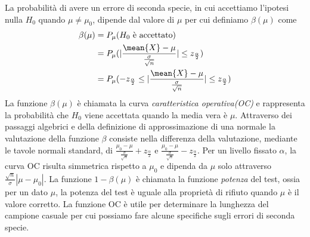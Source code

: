 La probabilità di avere un errore di seconda specie, in cui accettiamo l'ipotesi nulla $H_0$ quando $\mu \neq \mu_0$,
dipende dal valore di $\mu$ per cui definiamo $\beta(\mu)$ come
\[  \begin{split}
    \beta(\mu) & = P_{\mu}(H_0 \text{ è accettato}) \\
               & = P_{\mu}(|\frac{\mean{X} - \mu}{\frac{\sigma}{\sqrt{n}}}| \leq z_{\frac{\alpha}{2}}) \\
               & = P_{\mu}(-z_{\frac{\alpha}{2}} \leq |\frac{\mean{X} - \mu}{\frac{\sigma}{\sqrt{n}}}| \leq z_{\frac{\alpha}{2}})\\
    \end{split} \]
La funzione $\beta(\mu)$ è chiamata la curva \emph{caratteristica operativa(OC)} e rappresenta la probabilità che $H_0$
viene accettata quando la media vera è $\mu$.
Attraverso dei passaggi algebrici e della definizione di approssimazione di una normale la valutazione della funzione
$\beta$ consiste nella differenza della valutazione, mediante le tavole normali standard, di $\frac{\mu_0 -
\mu}{\frac{\sigma}{\sqrt{n}}} + z_{\frac{\alpha}{2}}$ e $\frac{\mu_0 - \mu}{\frac{\sigma}{\sqrt{n}}} -z_{\frac{\alpha}{2}}$.
Per un livello fissato $\alpha$, la curva OC risulta simmetrica rispetto a $\mu_0$ e dipenda da $\mu$ solo attraverso
$\frac{\sqrt{n}}{\sigma} |\mu - \mu_0|$.\newline
La funzione $1 - \beta(\mu)$ è chiamata la funzione \emph{potenza} del test, ossia per un dato $\mu$, la potenza del
test è uguale alla proprietà di rifiuto quando $\mu$ è il valore corretto.\newline
La funzione OC è utile per determinare la lunghezza del campione casuale per cui possiamo fare alcune specifiche sugli
errori di seconda specie.


